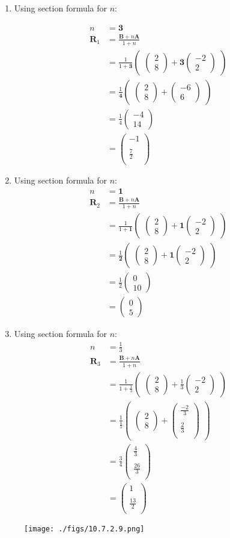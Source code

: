 \documentclass[12pt]{article}
\newcommand{\myvec}[1]{\ensuremath{\begin{pmatrix}#1\end{pmatrix}}}
\let\vec\mathbf
\begin{document}
\begin{enumerate}

\item Using section formula for $n$:
    
\begin{align}
n&=\vec{3}\\
\vec{R}_1&=\frac{\vec{B}+n\vec{A}}{1+n}\\
&=\frac{1}{1+\vec{3}}  \myvec{\myvec{
2\\
8
}
  +
   \vec{3}\myvec{
-2\\
2
}}\\
&= \frac{1}{\vec{4}} \myvec{\myvec{
2\\
8
}
  +
\myvec{
-6\\
6
}} \\
&=\frac{1}{4}
\myvec{
-4\\
14
}\\
&=\myvec{
-1\\
\\
\frac{7}{2}\\
}
\end{align}

\item Using section formula for $n$:
\begin{align}
n&=\vec{1}\\
\vec{R}_2&=\frac{\vec{B}+n\vec{A}}{1+n}\\
&=\frac{1}{1+\vec{1}}  \myvec{\myvec{
2\\
8
}
  +
   \vec{1}\myvec{
-2\\
2
}}\\
&= \frac{1}{\vec{2}} \myvec{\myvec{
2\\
8
}
  +
\vec{1}\myvec{
-2\\
2
}} \\
&=\frac{1}{2}
\myvec{
0\\
10
}\\
&=\myvec{
0\\
5
}
\end{align}

\item Using section formula for $n$:
\begin{align}
n&=\frac{1}{3}\\
\vec{R}_3&=\frac{\vec{B}+n\vec{A}}{1+n}\\
&=\frac{1}{1+\frac{1}{3}}  \myvec{\myvec{
2\\
8
}
  +
   \frac{1}{3}\myvec{
-2\\
2
}}\\
&= \frac{1}{\frac{4}{3}} \myvec{\myvec{
2\\
8
}
  +
\myvec{
\frac{-2}{3}\\
\\
\frac{2}{3}\\
}} \\
&=\frac{3}{4}
\myvec{
\frac{4}{3}\\
\\
\frac{26}{3}\\
}\\
&=\myvec{
1\\
\\
\frac{13}{2}\\
}
\end{align}

\end{enumerate}
\begin{figure}[!h]
\begin{center}
   \texttt{[image: ./figs/10.7.2.9.png]}
\end{center}
\caption{}
\label{fig:Fig}
\end{figure}
\end{document}
